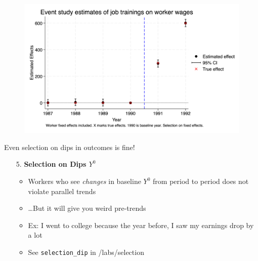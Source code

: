 \documentclass{beamer}
\begin{document}
\begin{frame}
 
\begin{figure}
    \centering
    \includegraphics[width=\textwidth]{./lecture_includes/selection_fe.png}
\end{figure}

\end{frame}







\begin{frame}{Even selection on dips in outcomes is fine!}
\begin{enumerate}
    
    \item[5. ] \textbf{Selection on Dips $Y^0$}
    \begin{itemize}
        \item Workers who see \emph{changes} in baseline $Y^0$ from period to period does not violate parallel trends
        \item \dots But it will give you weird pre-trends
        \item Ex: I went to college because the year before, I saw my earnings drop by a lot
        \item See \texttt{selection_dip} in /labs/selection
    \end{itemize}
    
\end{enumerate}
\end{frame}
\end{document}
